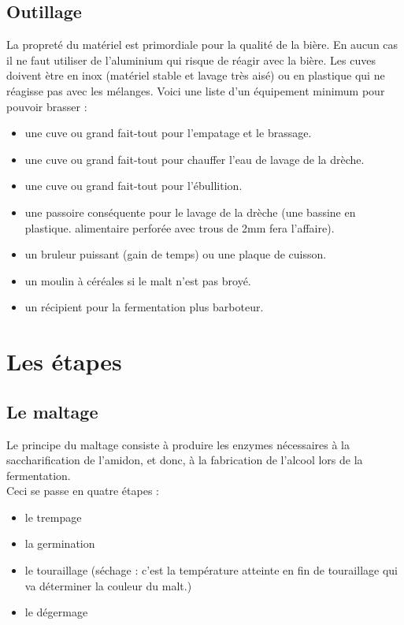 \documentclass{report}
\begin{document}
\section{Outillage}
La propreté du matériel est primordiale pour la qualité de la bière. En aucun cas il ne faut utiliser de l'aluminium qui risque de réagir avec la bière. Les cuves doivent ètre en inox (matériel stable et lavage très aisé) ou en plastique qui ne réagisse pas avec les mélanges.
Voici une liste d'un équipement minimum pour pouvoir brasser :
\begin{itemize}
\item    une cuve ou grand fait-tout pour l'empatage et le brassage.
\item    une cuve ou grand fait-tout pour chauffer l'eau de lavage de la drèche.
\item     une cuve ou grand fait-tout pour l'ébullition.
\item    une passoire conséquente pour le lavage de la drèche (une bassine en plastique. alimentaire perforée avec trous de 2mm fera l'affaire).
\item    un bruleur puissant (gain de temps) ou une plaque de cuisson.
\item   un moulin à céréales si le malt n'est pas broyé.
\item   un récipient pour la fermentation plus barboteur.
\end{itemize}

\chapter{Les étapes}
\section{Le maltage}

Le principe du maltage consiste à produire les enzymes nécessaires à la saccharification de l'amidon, et donc, à la fabrication de l'alcool lors de la fermentation.\\
Ceci se passe en quatre étapes :
\begin{itemize}
  \item le trempage
  \item la germination
   \item le touraillage (séchage : c'est la température atteinte en fin de touraillage qui va déterminer la couleur du malt.)
   \item le dégermage
\end{itemize} 
\end{document}
